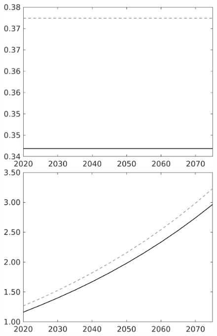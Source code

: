 \documentclass[12pt]{article}
\begin{document}
\begin{figure}[h!!]
\begin{minipage}[]{0.32\textwidth}
	\end{minipage}	
	\begin{minipage}[]{0.32\textwidth}
		\includegraphics[width=1\textwidth]{../../codding_model/own_basedOnFried/optimalPol_010922_revision/figures/all_13Sept22/CompTaul_Equlab_LFBAU_Reg0_hh_spillover0_nsk1_xgr0_knspil0_sep1_countec0_GovRev0_etaa0.79_lgd0.png}
	\end{minipage}	
	\begin{minipage}[]{0.32\textwidth}
		\includegraphics[width=1\textwidth]{../../codding_model/own_basedOnFried/optimalPol_010922_revision/figures/all_13Sept22/CompTaul_Equlab_LFBAU_Reg0_C_spillover0_nsk1_xgr0_knspil0_sep1_countec0_GovRev0_etaa0.79_lgd0.png}

\end{minipage}
\end{figure}
\end{document}
